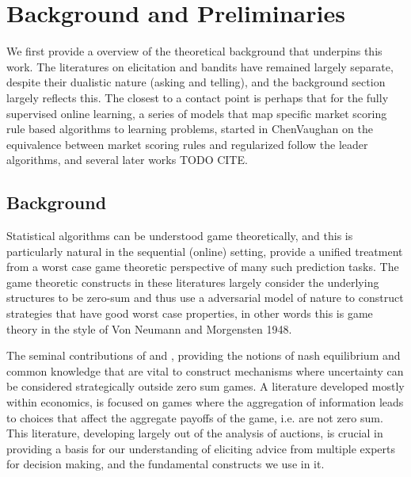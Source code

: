 \chapter{Background and Preliminaries}
\label{cha:background}




We first provide a overview of the theoretical background that underpins this work.
The literatures on elicitation and bandits have remained largely separate, despite their dualistic nature (asking and telling), and the background section largely reflects this. The closest to a contact point is perhaps that for the fully supervised online learning, a series of models that map specific market scoring rule based algorithms to learning problems, started in ChenVaughan on the equivalence between market scoring rules and regularized follow the leader algorithms, and several later works TODO CITE.



\section{Background}

Statistical algorithms can be understood game theoretically, and this is particularly natural in the sequential (online) setting, \cite{cesa2006prediction} provide a unified treatment from a worst case game theoretic perspective of many such prediction tasks.
The game theoretic constructs in these literatures largely consider the underlying structures to be zero-sum and thus use a adversarial model of nature to construct strategies that have good worst case properties, in other words this is game theory in the style of Von Neumann and Morgensten 1948.

The seminal contributions of \cite{nash1950equilibrium} and  \cite{aumann1976agreeing}, providing the notions of nash equilibrium and common knowledge that are vital to construct  mechanisms where uncertainty can be considered strategically outside zero sum games.
A literature developed mostly within economics, is focused on games where the aggregation of information leads to choices that affect the aggregate payoffs of the game, i.e.  are not zero sum. 
This literature,  developing largely out of the analysis of auctions, is crucial in providing a basis for our understanding of eliciting advice from multiple experts for decision making, and the fundamental constructs we use in it.


